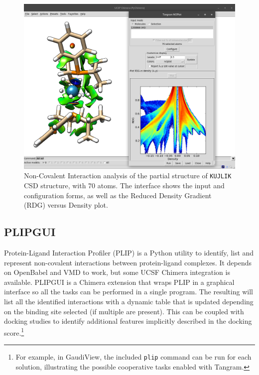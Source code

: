 \begin{figure}
	\begin{Center}
		\includegraphics[width=\textwidth]{./figures/05/tangram_nciplot.png}
		\cprotect\caption[Tangram NCIPlotGUI]{Non-Covalent Interaction analysis of the partial structure of \texttt{KUJLIK} CSD structure,\cite{kujlik} with 70 atoms. The interface shows the input and configuration forms, as well as the Reduced Density Gradient (RDG) versus Density plot.}
		\label{fig:tangram-nciplot}
	\end{Center}
\end{figure}

\subsection{PLIPGUI}
Protein-Ligand Interaction Profiler (PLIP)\cite{salentin2015plip} is a Python utility to identify, list and represent non-covalent interactions between protein-ligand complexes. It depends on OpenBabel and VMD to work, but some UCSF Chimera integration is available. PLIPGUI is a Chimera extension that wraps PLIP in a graphical interface so all the tasks can be performed in a single program. The resulting will list all the identified interactions with a dynamic table that is updated depending on the binding site selected (if multiple are present). This can be coupled with docking studies to identify additional features implicitly described in the docking score.\footnote{For example, in GaudiView, the included \texttt{plip} command can be run for each solution, illustrating the possible cooperative tasks enabled with Tangram.}

